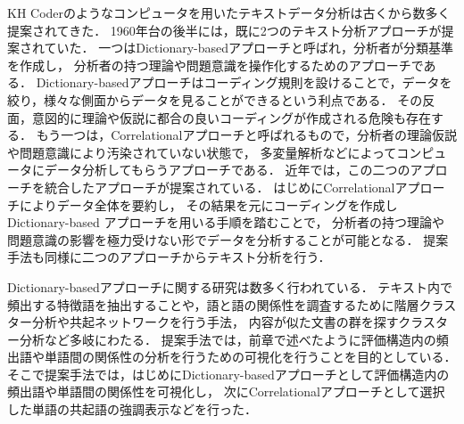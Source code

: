 \documentclass[syuuron]{kuee}
\begin{document}
		KH Coderのようなコンピュータを用いたテキストデータ分析は古くから数多く提案されてきた．
		1960年台の後半には，既に2つのテキスト分析アプローチが提案されていた．
		一つはDictionary-basedアプローチと呼ばれ，分析者が分類基準を作成し，
		分析者の持つ理論や問題意識を操作化するためのアプローチである\cite{kh3}．
		Dictionary-basedアプローチはコーディング規則を設けることで，データを絞り，様々な側面からデータを見ることができるという利点である．
		その反面，意図的に理論や仮説に都合の良いコーディングが作成される危険も存在する．
		もう一つは，Correlationalアプローチと呼ばれるもので，分析者の理論仮説や問題意識により汚染されていない状態で，
		多変量解析などによってコンピュータにデータ分析してもらうアプローチである．
		近年では，この二つのアプローチを統合したアプローチが提案されている\cite{kh1}\cite{kh2}．
		はじめにCorrelationalアプローチによりデータ全体を要約し，
		その結果を元にコーディングを作成しDictionary-based アプローチを用いる手順を踏むことで，
		分析者の持つ理論や問題意識の影響を極力受けない形でデータを分析することが可能となる．
		提案手法も同様に二つのアプローチからテキスト分析を行う．
		
		Dictionary-basedアプローチに関する研究は数多く行われている．
		テキスト内で頻出する特徴語を抽出することや，語と語の関係性を調査するために階層クラスター分析や共起ネットワークを行う手法，
		内容が似た文書の群を探すクラスター分析など多岐にわたる．
		提案手法では，前章で述べたように評価構造内の頻出語や単語間の関係性の分析を行うための可視化を行うことを目的としている．
		そこで提案手法では，はじめにDictionary-basedアプローチとして評価構造内の頻出語や単語間の関係性を可視化し，
		次にCorrelationalアプローチとして選択した単語の共起語の強調表示などを行った．
		
\end{document}
